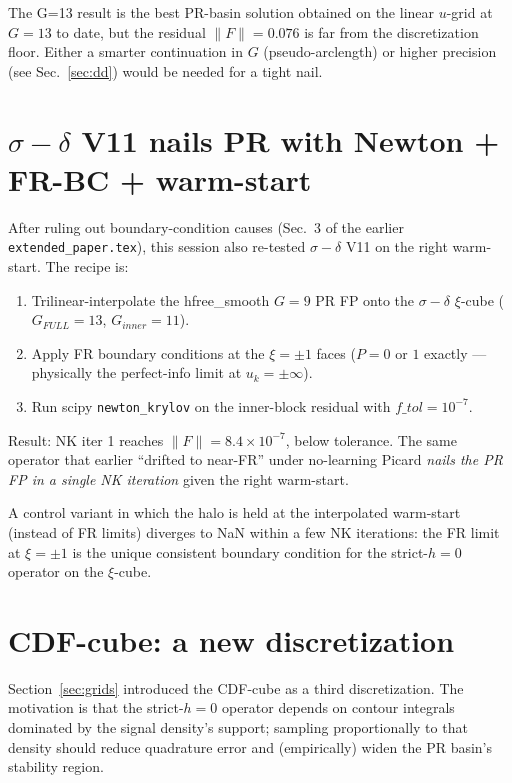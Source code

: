 \documentclass[11pt]{article}
\begin{document}
The G=13 result is the best PR-basin solution obtained on the linear $u$-grid
at $G=13$ to date, but the residual $\|F\|=0.076$ is far from the discretization
floor. Either a smarter continuation in $G$ (pseudo-arclength) or higher
precision (see Sec.~\ref{sec:dd}) would be needed for a tight nail.

\section{$\sigma{-}\delta$ V11 nails PR with Newton + FR-BC + warm-start}
\label{sec:sigdelta}

After ruling out boundary-condition causes (Sec.~3 of the earlier
\texttt{extended\_paper.tex}), this session also re-tested $\sigma{-}\delta$ V11
on the right warm-start. The recipe is:
\begin{enumerate}
\item Trilinear-interpolate the hfree\_smooth $G{=}9$ PR FP onto the
$\sigma{-}\delta$ $\xi$-cube ($G_{FULL}{=}13$, $G_{inner}{=}11$).
\item Apply FR boundary conditions at the $\xi{=}\pm 1$ faces ($P=0$ or $1$
exactly — physically the perfect-info limit at $u_k=\pm\infty$).
\item Run scipy \texttt{newton\_krylov} on the inner-block residual with
$f\_tol{=}10^{-7}$.
\end{enumerate}
Result: NK iter 1 reaches $\|F\|=8.4\!\times\!10^{-7}$, below tolerance.
The same operator that earlier ``drifted to near-FR'' under no-learning Picard
\emph{nails the PR FP in a single NK iteration} given the right warm-start.

A control variant in which the halo is held at the interpolated warm-start
(instead of FR limits) diverges to NaN within a few NK iterations: the
FR limit at $\xi=\pm 1$ is the unique consistent boundary condition for the
strict-$h{=}0$ operator on the $\xi$-cube.

\section{CDF-cube: a new discretization}

Section~\ref{sec:grids} introduced the CDF-cube as a third discretization.
The motivation is that the strict-$h{=}0$ operator depends on contour
integrals dominated by the signal density's support; sampling proportionally
to that density should reduce quadrature error and (empirically) widen the PR
basin's stability region.
\end{document}
